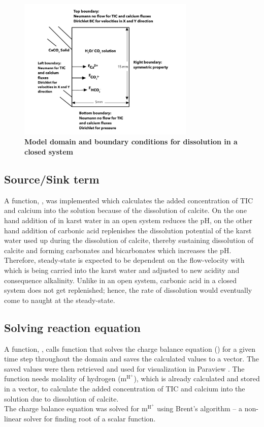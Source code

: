 \begin{figure}
    \centering
    \includegraphics[width=0.75\textwidth]{PICTURES/closed_system.jpg}
    \caption [Model domain and boundary conditions for  dissolution in a closed system] {\textbf{Model domain and boundary conditions for  dissolution in a closed system}}
    \label{fig:ClosedSystem}       %
\end{figure}
 

\subsection{Source/Sink term} A function, , was implemented which calculates the added concentration of 
TIC and calcium into the solution because of the dissolution of calcite. On the one hand addition of  in karst water in an open system 
reduces the pH, on the other hand addition of carbonic acid replenishes the dissolution potential of the karst water used up  
during the dissolution of calcite, thereby sustaining dissolution of calcite and forming carbonates and bicarbonates which increases the pH. 
Therefore, steady-state is expected to be dependent on the flow-velocity with which  is being carried into the karst water 
and adjusted to new acidity and consequence alkalinity. Unlike in an open system, carbonic acid in a closed system does not get 
replenished; hence, the rate of dissolution would eventually come to naught at the steady-state. 


\subsection{Solving reaction equation} A function, , calls  function that solves the charge 
balance equation () for a given time step throughout the domain and saves the calculated values to a vector. 
The saved values were then retrieved and used for visualization in Paraview \cite{ahrens2005paraview}. The function  needs molality of 
hydrogen ($\mathrm{m^{H^+}}$), which is already calculated and stored in a vector, to calculate the added concentration of TIC 
and calcium into the solution due to dissolution of calcite. \\
The charge balance equation was solved for $\mathrm{m^{H^+}}$ using Brent's algorithm \cite{brent1971algorithm} -- a non-linear solver 
for finding root of a scalar function. 


